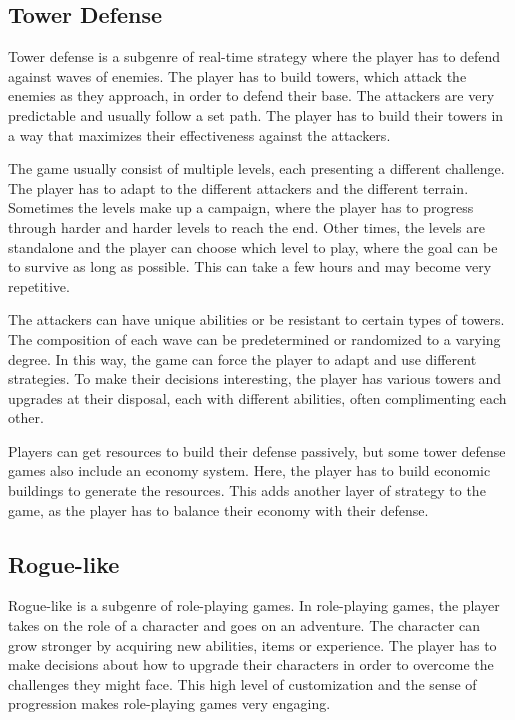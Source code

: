 \subsection{Tower Defense}

Tower defense is a subgenre of real-time strategy where the player has to defend against waves of enemies. The player has to build towers, which attack the enemies as they approach, in order to defend their base. The attackers are very predictable and usually follow a set path. The player has to build their towers in a way that maximizes their effectiveness against the attackers.

The game usually consist of multiple levels, each presenting a different challenge. The player has to adapt to the different attackers and the different terrain. Sometimes the levels make up a campaign, where the player has to progress through harder and harder levels to reach the end. Other times, the levels are standalone and the player can choose which level to play, where the goal can be to survive as long as possible. This can take a few hours and may become very repetitive.

The attackers can have unique abilities or be resistant to certain types of towers. The composition of each wave can be predetermined or randomized to a varying degree. In this way, the game can force the player to adapt and use different strategies. To make their decisions interesting, the player has various towers and upgrades at their disposal, each with different abilities, often complimenting each other.

Players can get resources to build their defense passively, but some tower defense games also include an economy system. Here, the player has to build economic buildings to generate the resources. This adds another layer of strategy to the game, as the player has to balance their economy with their defense.

\subsection{Rogue-like}

Rogue-like is a subgenre of role-playing games. In role-playing games, the player takes on the role of a character and goes on an adventure. The character can grow stronger by acquiring new abilities, items or experience. The player has to make decisions about how to upgrade their characters in order to overcome the challenges they might face. This high level of customization and the sense of progression makes role-playing games very engaging.

